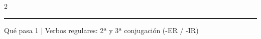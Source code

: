 \documentclass[10pt, a4paper]{article}
\begin{document}
\begin{multicols}{2}
\begin{merkbox}
\end{merkbox}

\end{multicols}


\vfill

\noindent\rule{\textwidth}{0.5pt}

\vspace{2pt}

{\footnotesize\textcolor{mittelgrau}{Qué pasa 1 | Verbos regulares: 2ª y 3ª conjugación (-ER / -IR)}}
\end{document}
